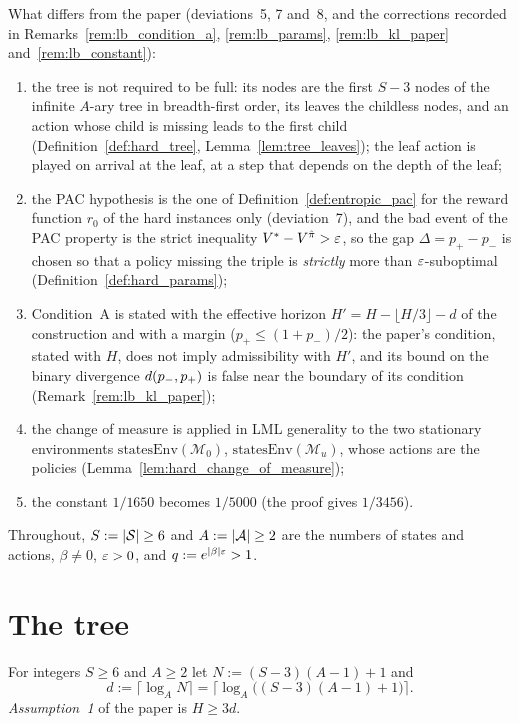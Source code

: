 What differs from the paper (deviations~5, 7 and~8, and the corrections recorded in
Remarks~\ref{rem:lb_condition_a}, \ref{rem:lb_params}, \ref{rem:lb_kl_paper}
and~\ref{rem:lb_constant}):
\begin{enumerate}
  \item[(i)] the tree is not required to be full: its nodes are the first $S - 3$ nodes of the
        infinite $A$-ary tree in breadth-first order, its leaves the childless nodes, and an
        action whose child is missing leads to the first child (Definition~\ref{def:hard_tree},
        Lemma~\ref{lem:tree_leaves}); the leaf action is played on arrival at the leaf, at a step
        that depends on the depth of the leaf;
  \item[(ii)] the PAC hypothesis is the one of Definition~\ref{def:entropic_pac} for the reward
        function $r_0$ of the hard instances only (deviation~7), and the bad event of the PAC
        property is the strict inequality $V^* - V^{\hat\pi} > \varepsilon$, so the gap $\Delta = p_+ - p_-$
        is chosen so that a policy missing the triple is \emph{strictly} more than
        $\varepsilon$-suboptimal (Definition~\ref{def:hard_params});
  \item[(iii)] Condition~A is stated with the effective horizon $H' = H - \lfloor H/3\rfloor - d$
        of the construction and with a margin ($p_+ \le (1 + p_-)/2$): the paper's condition,
        stated with $H$, does not imply admissibility with $H'$, and its bound on the binary
        divergence $d(p_-, p_+)$ is false near the boundary of its condition
        (Remark~\ref{rem:lb_kl_paper});
  \item[(iv)] the change of measure is applied in LML generality to the two stationary
        environments $\mathrm{statesEnv}(\mathcal M_0)$, $\mathrm{statesEnv}(\mathcal M_u)$,
        whose actions are the policies (Lemma~\ref{lem:hard_change_of_measure});
  \item[(v)] the constant $1/1650$ becomes $1/5000$ (the proof gives $1/3456$).
\end{enumerate}
Throughout, $S := \lvert \mathcal{S} \rvert \ge 6$ and $A := \lvert \mathcal{A} \rvert \ge 2$ are the numbers of states and
actions, $\beta \ne 0$, $\varepsilon > 0$, and $q := e^{|\beta|\varepsilon} > 1$.

\section{The tree}
\label{sec:lb_tree}

\begin{definition}\label{def:tree_depth}
\leanok
For integers $S \ge 6$ and $A \ge 2$ let $N := (S - 3)(A - 1) + 1$ and
\[
  d := \lceil \log_A N \rceil = \big\lceil \log_A\big((S-3)(A-1) + 1\big)\big\rceil .
\]
\emph{Assumption~1} of the paper is $H \ge 3d$.
\end{definition}

